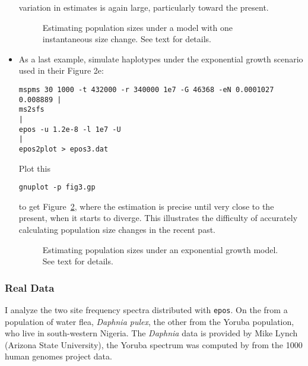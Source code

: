 \documentclass[a4paper, english]{article}
\newcommand{\ty}{\texttt}
\begin{document}
\begin{itemize}
variation in estimates is again large, particularly toward the present.
\begin{figure}
  \begin{center}
    \scalebox{0.6}{}
  \end{center}
  \caption{Estimating population sizes under a model with one
    instantaneous size change. See text for details.}\label{fig:2b}
\end{figure}
\item As a last example, simulate haplotypes under
  the exponential growth scenario \cite{liu15:exp} used in their
  Figure 2e:
    \small
\begin{verbatim}
mspms 30 1000 -t 432000 -r 340000 1e7 -G 46368 -eN 0.0001027 0.008889 |
ms2sfs                                                                |
epos -u 1.2e-8 -l 1e7 -U                                              |
epos2plot > epos3.dat
\end{verbatim}
\normalsize
Plot this
\begin{verbatim}
gnuplot -p fig3.gp
\end{verbatim}
to get Figure~\ref{fig:2e}, where the estimation is precise until very
close to the present, when it starts to diverge. This illustrates
the difficulty of accurately calculating population size changes
in the recent past.
\begin{figure}
  \begin{center}
    \scalebox{0.6}{}
  \end{center}
  \caption{Estimating population sizes under an exponential growth
    model. See text for details.}\label{fig:2e}
\end{figure}
\end{itemize}

\subsubsection*{Real Data}
I analyze the two site frequency spectra distributed with
\ty{epos}. On the from a population of water flea, \textit{Daphnia
  pulex}, the other from the Yoruba population, who live in
south-western Nigeria. The \textit{Daphnia} data is provided by Mike
Lynch (Arizona State University), the Yoruba spectrum was computed by
\cite{lap17:acc} from the 1000 human genomes project data.
\end{document}
